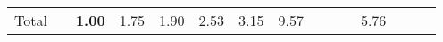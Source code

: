 \begin{tabular}{ll|rrrrrr|rrrrrrr}
  \hline
  Total  & &



  


  
  \textbf{1.00} & 1.75 & 1.90 & 2.53 & 3.15 & 9.57 &  &  &  & 5.76 &  \\


\end{tabular}
